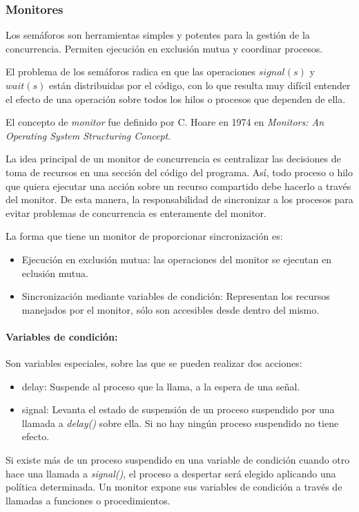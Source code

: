 \subsubsection{Monitores}
\label{monitores}

Los semáforos son herramientas simples y potentes para la gestión de la
concurrencia. Permiten ejecución en exclusión mutua y coordinar procesos.

El problema de los semáforos radica en que las operaciones $signal(s)$ y
$wait(s)$ están distribuidas por el código, con lo que resulta muy difícil
entender el efecto de una operación sobre todos los hilos o procesos que
dependen de ella.

El concepto de \textit{monitor} fue definido por C. Hoare en 1974 en
\textit{Monitors: An Operating System Structuring Concept}.

La idea principal de un monitor de concurrencia es centralizar las decisiones de
toma de recursos en una sección del código del programa. Así, todo proceso
o hilo que quiera ejecutar una acción sobre un recurso compartido debe hacerlo a
través del monitor. De esta manera, la responsabilidad de sincronizar a los
procesos para evitar problemas de concurrencia es enteramente del monitor.

La forma que tiene un monitor de proporcionar sincronización es:
\begin{itemize}
    \item Ejecución en exclusión mutua: las operaciones del monitor se ejecutan
    en eclusión mutua.
    \item Sincronización mediante variables de condición: Representan los
    recursos manejados por el monitor, sólo son accesibles desde dentro del
    mismo.
\end{itemize}

\begin{framed}
\paragraph{Variables de condición:} Son variables especiales, sobre las que se
pueden realizar dos acciones:
\begin{itemize}
    \item delay: Suspende al proceso que la llama, a la espera de una señal.
    \item signal: Levanta el estado de suspensión de un proceso suspendido por
    una llamada a \textit{delay()} sobre ella. Si no hay ningún proceso
    suspendido no tiene efecto.
\end{itemize}
Si existe más de un proceso suspendido en una variable de condición cuando otro
hace una llamada a \textit{signal()}, el proceso a despertar será elegido
aplicando una política determinada.
Un monitor expone sus variables de condición a través de llamadas a funciones o
procedimientos.
\end{framed}

